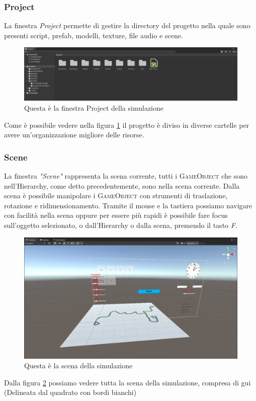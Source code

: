 \documentclass[12pt, openany]{book}
\begin{document}
	\subsubsection{Project}
	La finestra \emph{Project} permette di gestire la directory del progetto nella quale sono presenti script, prefab, modelli, texture, file audio e scene.
	\begin{figure}[H]
		\centering
		\includegraphics[width=1\linewidth]{"Immagini/Project"}
		\caption{Questa è la finestra Project della simulazione}
		\label{fig:Project}	
	\end{figure}
	Come è possibile vedere nella figura \ref{fig:Project} il progetto è diviso in diverse cartelle per avere un'organizzazione migliore delle risorse.
	
	\subsubsection{Scene}
		La finestra \emph{"Scene"} rappresenta la scena corrente, tutti i \textsc{GameObject} che sono nell'Hierarchy, come detto precedentemente, sono nella scena corrente. Dalla scena è possibile manipolare i \textsc{GameObject} con strumenti di traslazione, rotazione e ridimensionamento. Tramite il mouse e la tastiera possiamo navigare con facilità nella scena oppure per essere più rapidi è possibile fare focus sull'oggetto selezionato, o dall'Hierarchy o dalla scena, premendo il tasto \emph{F}.
		\begin{figure}[H]
			\centering
			\includegraphics[width=0.72\linewidth]{"Immagini/Scene.png"}
			\caption{Questa è la scena della simulazione}
			\label{fig:Scene}
		\end{figure}
	Dalla figura \ref{fig:Scene} possiamo vedere tutta la scena della simulazione, compresa di gui (Delineata dal quadrato con bordi bianchi)
\end{document}
